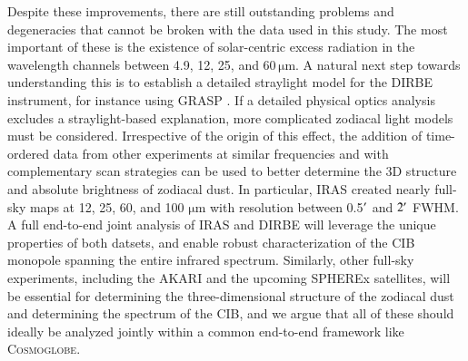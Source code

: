 \documentclass{aa}
\def\Cosmoglobe{\textsc{Cosmoglobe}}
\begin{document}
Despite these improvements, there are still outstanding problems and degeneracies that cannot be broken with the data used in this study. The most important of these is the existence of solar-centric excess radiation in the wavelength channels between 4.9, 12, 25, and 60\,$\mathrm{\mu m}$. A natural next step towards understanding this is to establish a detailed straylight model for the DIRBE instrument, for instance using GRASP \citep{grasp}. If a detailed physical optics analysis excludes a straylight-based explanation, more complicated zodiacal light models must be considered. Irrespective of the origin of this effect, the addition of time-ordered data from other experiments at similar frequencies and with complementary scan strategies can be used to better determine the 3D structure and absolute brightness of zodiacal dust. In particular, IRAS \citep{boggess92} created nearly full-sky maps at 12, 25, 60, and 100 $\mathrm{\mu m}$ with resolution between 0.5$\arcm$ and $2\arcm$ FWHM. A full end-to-end joint analysis of IRAS and DIRBE will leverage the unique properties of both datsets, and enable robust characterization of the CIB monopole spanning the entire infrared spectrum. Similarly, other full-sky experiments, including the AKARI \citep{murakami:2007} and the upcoming SPHEREx \citep{dore:2014} satellites, will be essential for determining the three-dimensional structure of the zodiacal dust and determining the spectrum of the CIB, and we argue that all of these should ideally be analyzed jointly within a common end-to-end framework like \Cosmoglobe. 
\end{document}
